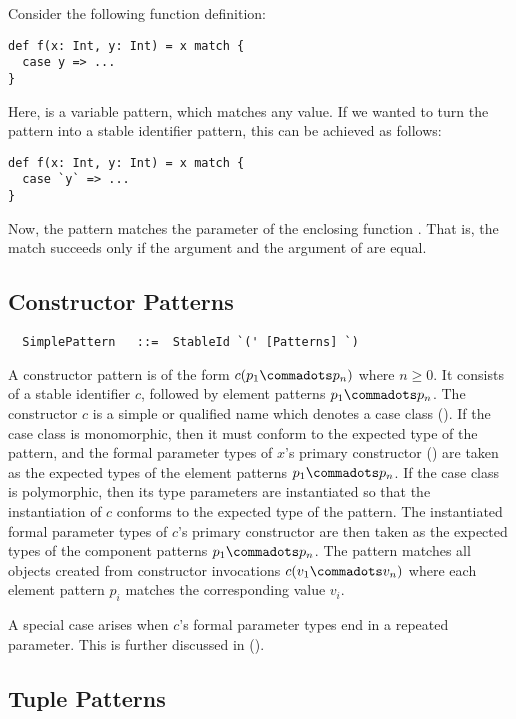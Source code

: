 \example Consider the following function definition:
\begin{lstlisting}
def f(x: Int, y: Int) = x match {
  case y => ...
}
\end{lstlisting}
Here, \lstinline@y@ is a variable pattern, which matches any value.
If we wanted to turn the pattern into a stable identifier pattern, this
can be achieved as follows:
\begin{lstlisting}
def f(x: Int, y: Int) = x match {
  case `y` => ...
}
\end{lstlisting}
Now, the pattern matches the  parameter of the enclosing function .
That is, the match succeeds only if the  argument and the 
argument of  are equal.

\subsection{Constructor Patterns}

\syntax\begin{lstlisting}
  SimplePattern   ::=  StableId `(' [Patterns] `)
\end{lstlisting}

A constructor pattern is of the form $c(p_1 \commadots p_n)$ where $n
\geq 0$. It consists of a stable identifier $c$, followed by element
patterns $p_1 \commadots p_n$. The constructor $c$ is a simple or
qualified name which denotes a case class
(). If the case class is monomorphic, then it
must conform to the expected type of the pattern, and the formal
parameter types of $x$'s primary constructor ()
are taken as the expected types of the element patterns $p_1\commadots
p_n$.  If the case class is polymorphic, then its type parameters are
instantiated so that the instantiation of $c$ conforms to the expected
type of the pattern. The instantiated formal parameter types of $c$'s
primary constructor are then taken as the expected types of the
component patterns $p_1\commadots p_n$.  The pattern matches all
objects created from constructor invocations $c(v_1 \commadots v_n)$
where each element pattern $p_i$ matches the corresponding value
$v_i$.

A special case arises when $c$'s formal parameter types end in a
repeated parameter. This is further discussed in
().

\subsection{Tuple Patterns}


